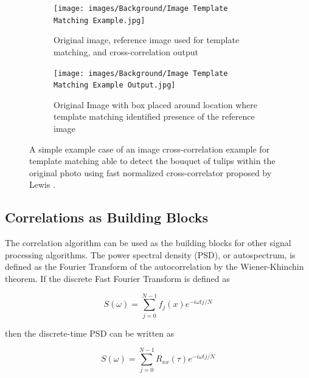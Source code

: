             \begin{figure} [h]
                \centering
                \begin{subfigure}[c]{0.45\textwidth}
                    \centering
                    \texttt{[image: images/Background/Image Template Matching Example.jpg]}
                    \caption{Original image, reference image used for template matching, and cross-correlation output}
                    \label{fig: template matching 1}
                \end{subfigure}
                \hfill
                \begin{subfigure}[c]{0.45\textwidth}
                    \centering
                    \texttt{[image: images/Background/Image Template Matching Example Output.jpg]}
                    \caption{Original Image with box placed around location where template matching identified presence of the reference image}
                    \label{fig:template match out}
                \end{subfigure}
                \hfill
                \caption{A simple example case of an image cross-correlation example for template matching able to detect the bouquet of tulips within the original photo using fast normalized cross-correlator proposed by Lewis \cite{lewis_fast_1995}.}
                \label{fig:template match example}
            \end{figure}


        \subsection{Correlations as Building Blocks} \label{ss:corr building blocks}

            The correlation algorithm can be used as the building blocks for other signal processing algorithms. The power spectral density (PSD), or autospectrum, is defined as the Fourier Transform of the autocorrelation by the Wiener-Khinchin theorem. If the discrete Fast Fourier Transform is defined as 

            \[
                S(\omega) = \sum_{j=0}^{N - 1}f_j(x)e^{-i\omega t j/N}
            \]
            
            then the discrete-time PSD can be written as
            
            \begin{equation}
                S(\omega) = \sum_{j=0}^{N-1}R_{xx}(\tau)e^{-i\omega t j/N}
            \end{equation}

